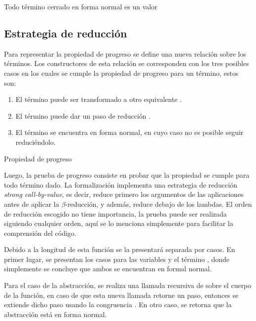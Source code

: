 \begin{codigo}
	Todo término cerrado en forma normal es un valor
\end{codigo}

\subsection{Estrategia de reducción}

Para representar la propiedad de progreso se define una nueva relación  sobre los términos.
Los constructores de esta relación se corresponden con los tres posibles casos en los cuales se cumple la propiedad de progreso para un término, estos son:
\begin{enumerate}
	\item El término puede ser transformado a otro equivalente \type{$\_\rightleftarrows\_$}.
	\item El término puede dar un paso de reducción \type{$\_\hookrightarrow\_$}.
	\item El término se encuentra en forma normal, en cuyo caso no es posible seguir reduciéndolo.
\end{enumerate}

\begin{codigo}
	Propiedad de progreso
\end{codigo}

Luego, la prueba de progreso consiste en probar que la propiedad  se cumple para todo término dado.
La formalización implementa una estrategia de reducción \textit{strong call-by-value}, es decir, reduce primero los argumentos de las aplicaciones antes de aplicar la $\beta$-reducción, y además, reduce debajo de los lambdas.
El orden de reducción escogido no tiene importancia, la prueba puede ser realizada siguiendo cualquier orden, aquí se lo menciona simplemente para facilitar la comprensión del código.

Debido a la longitud de esta función se la presentará separada por casos.
En primer lugar, se presentan los casos para las variables y el término \const{$\star$}, donde simplemente se concluye que ambos se encuentran en formal normal.


Para el caso de la abstracción, se realiza una llamada recursiva de  sobre el cuerpo de la función, en caso de que esta nueva llamada retorne un paso, entonces se extiende dicho paso usando la congruencia \const{$\zeta$}.
En otro caso, se retorna que la abstracción está en forma normal.

